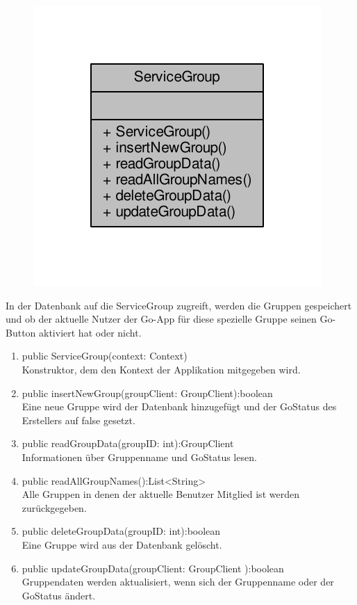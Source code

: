 \begin{figure}[H]
	\includegraphics[scale = 1]{res/umlClasses/service_group__coll__graph.pdf}
	\centering
\end{figure}
In der Datenbank auf die ServiceGroup zugreift, werden die Gruppen gespeichert und ob der aktuelle Nutzer der Go-App für diese spezielle Gruppe seinen Go-Button aktiviert hat oder nicht. 
\begin{enumerate}
	\item public ServiceGroup(context: Context)\\
		Konstruktor, dem den Kontext der Applikation mitgegeben wird.
	\item public insertNewGroup(groupClient: GroupClient):boolean\\
		Eine neue Gruppe wird der Datenbank hinzugefügt und der GoStatus des Erstellers auf false gesetzt.
	\item public readGroupData(groupID: int):GroupClient \\
		Informationen über Gruppenname und GoStatus lesen. 
	\item public readAllGroupNames():List<String>\\
		Alle Gruppen in denen der aktuelle Benutzer Mitglied ist werden zurückgegeben.
	\item public deleteGroupData(groupID: int):boolean\\
		Eine Gruppe wird aus der Datenbank gelöscht.
	\item public updateGroupData(groupClient: GroupClient ):boolean\\
		Gruppendaten werden aktualisiert, wenn sich der Gruppenname oder der GoStatus ändert.
\end{enumerate}

